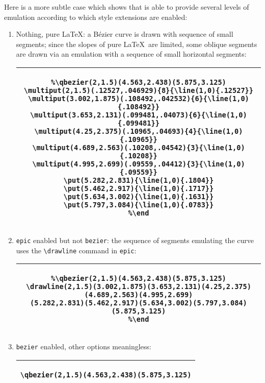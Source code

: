 \documentclass[11pt,a4paper]{article}
\begin{document}
\begin{enumerate}
Here is a more subtle case which shows that {\TC} is able to
provide several levels of emulation according to which style
extensions are enabled:
\begin{enumerate}
\item Nothing, pure \LaTeX : a B\'ezier curve is drawn with sequence of small
segments; since the slopes of pure \LaTeX\, are limited, some
oblique segments are drawn via an emulation with a sequence of small horizontal
segments:
  \begin{center}\tiny{
    \begin{tabular}{|c|}
    \hline
    \begin{minipage}[t]{0.75\linewidth}
    \begin{verbatim}
%\qbezier(2,1.5)(4.563,2.438)(5.875,3.125)
\multiput(2,1.5)(.12527,.046929){8}{\line(1,0){.12527}}
\multiput(3.002,1.875)(.108492,.042532){6}{\line(1,0){.108492}}
\multiput(3.653,2.131)(.099481,.04073){6}{\line(1,0){.099481}}
\multiput(4.25,2.375)(.10965,.04693){4}{\line(1,0){.10965}}
\multiput(4.689,2.563)(.10208,.04542){3}{\line(1,0){.10208}}
\multiput(4.995,2.699)(.09559,.04412){3}{\line(1,0){.09559}}
\put(5.282,2.831){\line(1,0){.1804}}
\put(5.462,2.917){\line(1,0){.1717}}
\put(5.634,3.002){\line(1,0){.1631}}
\put(5.797,3.084){\line(1,0){.0783}}
%\end
    \end{verbatim}
    \end{minipage}\\
    \hline
    \end{tabular}
  }\end{center}
\item {\tt epic} enabled but not {\tt bezier}: the sequence of segments emulating the curve
uses the \verb+\drawline+ command in {\tt epic}:
  \begin{center}\tiny{
    \begin{tabular}{|c|}
    \hline
    \begin{minipage}[t]{0.75\linewidth}
    \begin{verbatim}
%\qbezier(2,1.5)(4.563,2.438)(5.875,3.125)
\drawline(2,1.5)(3.002,1.875)(3.653,2.131)(4.25,2.375)(4.689,2.563)(4.995,2.699)
(5.282,2.831)(5.462,2.917)(5.634,3.002)(5.797,3.084)(5.875,3.125)
%\end
    \end{verbatim}
    \end{minipage}\\
    \hline
    \end{tabular}
  }\end{center}
\item {\tt bezier} enabled, other options meaningless:
  \begin{center}\footnotesize{
    \begin{tabular}{|c|}
    \hline
    \begin{minipage}[t]{0.75\linewidth}
    \begin{verbatim}
\qbezier(2,1.5)(4.563,2.438)(5.875,3.125)
    \end{verbatim}
    \end{minipage}\\
    \hline
    \end{tabular}
  }\end{center}


\end{enumerate}
\end{enumerate}
\end{document}
